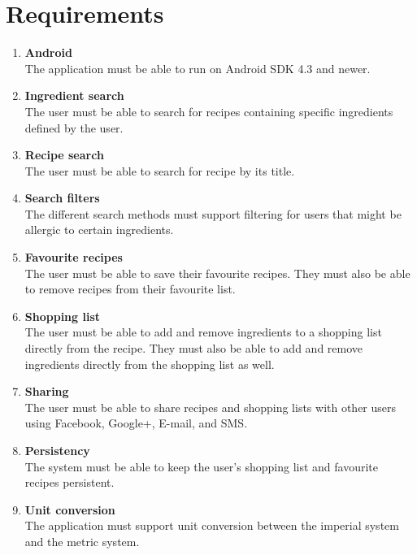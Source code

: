 \section{Requirements}
\begin{enumerate}
  \item\label{req:android} \textbf{Android} \\
    The application must be able to run on Android SDK 4.3 and newer.
    
  \item\label{req:ingredientsearch} \textbf{Ingredient search} \\
    The user must be able to search for recipes containing specific ingredients defined by the user.
    
  \item\label{req:recipesearch} \textbf{Recipe search} \\
    The user must be able to search for recipe by its title.
    
  \item\label{req:searchfilters} \textbf{Search filters} \\
    The different search methods must support filtering for users that might be allergic to certain ingredients.
    
  \item\label{req:favourite} \textbf{Favourite recipes} \\
    The user must be able to save their favourite recipes. They must also be able to remove recipes from their favourite list.
    
  \item\label{req:shoppinglist} \textbf{Shopping list} \\
    The user must be able to add and remove ingredients to a shopping list directly from the recipe. They must also be able to add and remove ingredients directly from the shopping list as well.
    
  \item\label{req:sharing} \textbf{Sharing} \\
    The user must be able to share recipes and shopping lists with other users using Facebook, Google+, E-mail, and SMS.
    
  \item\label{req:persistency} \textbf{Persistency} \\
    The system must be able to keep the user's shopping list and favourite recipes persistent.
    
  \item\label{req:unitconversion} \textbf{Unit conversion} \\
    The application must support unit conversion between the imperial system and the metric system.
    

\end{enumerate}
